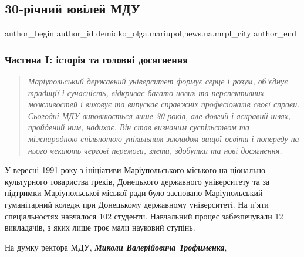  
 
 
 
 
 
\subsection{30-річний ювілей МДУ}
\label{sec:06_12_2021.stz.news.ua.mrpl_city.1.30_richnyj_jubilej_mdu}
 
\ifcmt
 author_begin
   author_id demidko_olga.mariupol,news.ua.mrpl_city
 author_end
\fi

\subsubsection{Частина I: історія та головні досягнення}

\begin{quote}
\em Маріупольський державний університет формує серце і розум, об'єднує традиції і
сучасність, відкриває багато нових та перспективних можливостей і виховує та
випускає справжніх професіоналів своєї справи. Сьогодні МДУ виповнюється лише
30 років, але довгий і яскравий шлях, пройдений ним, надихає. Він став визнаним
суспільством та міжнародною спільнотою унікальним закладом вищої освіти і
попереду на нього чекають чергові перемоги, злети, здобутки та нові досягнення.
\end{quote}


У вересні 1991 року з ініціативи Маріупольського міського
на\hyp{}ціонально-культурного товариства греків, Донецького державного університету
та за підтримки Маріупольської міської ради було засновано Маріупольський
гуманітарний коледж при Донецькому державному університеті. На п'яти
спеціальностях навчалося 102 студенти. Навчальний процес забезпечували 12
викладачів, з яких лише троє мали науковий ступінь.


На думку ректора МДУ, \emph{\textbf{Миколи Валерійовича Трофименка}},

